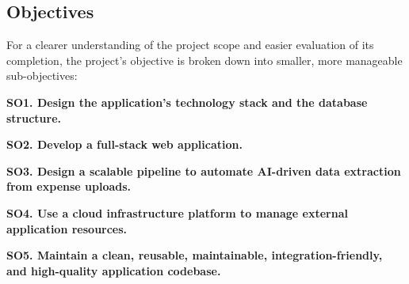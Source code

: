 \subsection{Objectives}
\label{sec:objectives}

For a clearer understanding of the project scope and easier evaluation of its completion, the project's objective is broken down into smaller, more manageable sub-objectives:


\textbf{SO1. Design the application's technology stack and the database structure.}

\textbf{SO2. Develop a full-stack web application.}

\textbf{SO3. Design a scalable pipeline to automate AI-driven data extraction from expense uploads.}

\textbf{SO4. Use a cloud infrastructure platform to manage external application resources.}

\textbf{SO5. Maintain a clean, reusable, maintainable, integration-friendly, and high-quality application codebase.}
